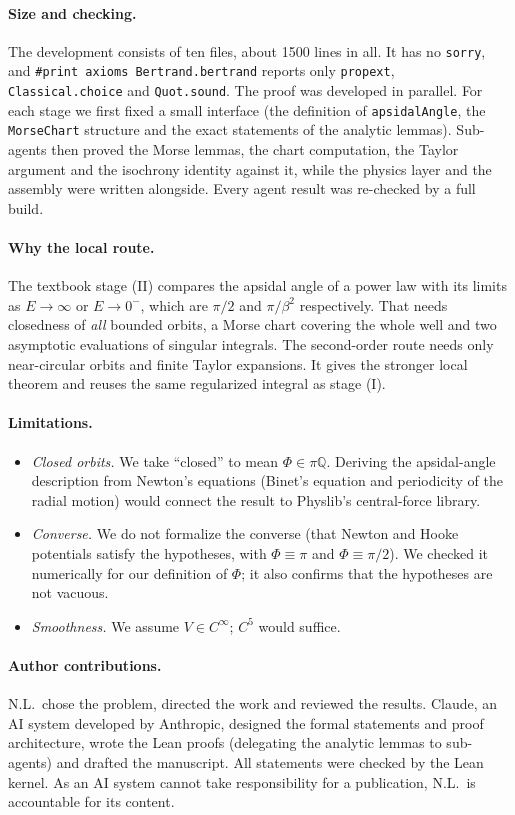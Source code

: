 \documentclass[11pt]{article}
\theoremstyle{remark}
\begin{document}
\paragraph{Size and checking.} The development consists of ten files, about 1500 lines in all. It
has no \texttt{sorry}, and \texttt{\#print axioms Bertrand.bertrand} reports only \texttt{propext},
\texttt{Classical.choice} and \texttt{Quot.sound}. The proof was developed in parallel. For each
stage we first fixed a small interface (the definition of \texttt{apsidalAngle}, the
\texttt{MorseChart} structure and the exact statements of the analytic lemmas). Sub-agents then
proved the Morse lemmas, the chart computation, the Taylor argument and the isochrony identity
against it, while the physics layer and the assembly were written alongside. Every agent result was
re-checked by a full build.

\paragraph{Why the local route.} The textbook stage (II) compares the apsidal angle of a power law
with its limits as $E\to\infty$ or $E\to0^-$, which are $\pi/2$ and $\pi/\beta^2$ respectively.
That needs closedness of \emph{all} bounded orbits, a Morse chart covering the whole well and two
asymptotic evaluations of singular integrals. The second-order route needs only near-circular
orbits and finite Taylor expansions. It gives the stronger local theorem and reuses the same
regularized integral as stage (I).

\paragraph{Limitations.}
\begin{itemize}
  \item \emph{Closed orbits.} We take ``closed'' to mean $\Phi\in\pi\mathbb{Q}$. Deriving the
  apsidal-angle description from Newton's equations (Binet's equation and periodicity of the
  radial motion) would connect the result to Physlib's central-force library.
  \item \emph{Converse.} We do not formalize the converse (that Newton and Hooke potentials
  satisfy the hypotheses, with $\Phi\equiv\pi$ and $\Phi\equiv\pi/2$). We checked it
  numerically for our definition of $\Phi$; it also confirms that the hypotheses are not vacuous.
  \item \emph{Smoothness.} We assume $V\in C^\infty$; $C^5$ would suffice.
\end{itemize}

\paragraph{Author contributions.} N.L.\ chose the problem, directed the work and reviewed the
results. Claude, an AI system developed by Anthropic, designed the formal statements and proof
architecture, wrote the Lean proofs (delegating the analytic lemmas to
sub-agents) and drafted the manuscript. All statements were checked by the Lean kernel. As an AI
system cannot take responsibility for a publication, N.L.\ is accountable for its content.



\end{document}
